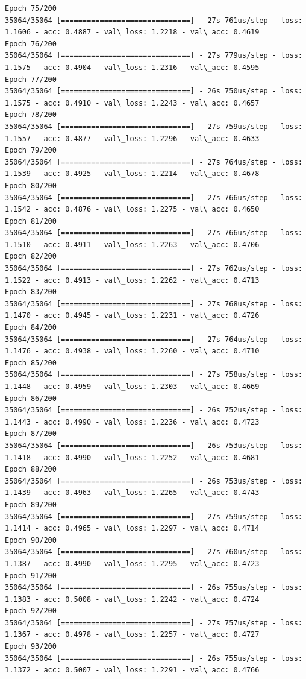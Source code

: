 \documentclass[11pt]{article}
\begin{document}
\begin{Verbatim}[commandchars=\\\{\}]
Epoch 75/200
35064/35064 [==============================] - 27s 761us/step - loss: 1.1606 - acc: 0.4887 - val\_loss: 1.2218 - val\_acc: 0.4619
Epoch 76/200
35064/35064 [==============================] - 27s 779us/step - loss: 1.1575 - acc: 0.4904 - val\_loss: 1.2316 - val\_acc: 0.4595
Epoch 77/200
35064/35064 [==============================] - 26s 750us/step - loss: 1.1575 - acc: 0.4910 - val\_loss: 1.2243 - val\_acc: 0.4657
Epoch 78/200
35064/35064 [==============================] - 27s 759us/step - loss: 1.1557 - acc: 0.4877 - val\_loss: 1.2296 - val\_acc: 0.4633
Epoch 79/200
35064/35064 [==============================] - 27s 764us/step - loss: 1.1539 - acc: 0.4925 - val\_loss: 1.2214 - val\_acc: 0.4678
Epoch 80/200
35064/35064 [==============================] - 27s 766us/step - loss: 1.1542 - acc: 0.4876 - val\_loss: 1.2275 - val\_acc: 0.4650
Epoch 81/200
35064/35064 [==============================] - 27s 766us/step - loss: 1.1510 - acc: 0.4911 - val\_loss: 1.2263 - val\_acc: 0.4706
Epoch 82/200
35064/35064 [==============================] - 27s 762us/step - loss: 1.1522 - acc: 0.4913 - val\_loss: 1.2262 - val\_acc: 0.4713
Epoch 83/200
35064/35064 [==============================] - 27s 768us/step - loss: 1.1470 - acc: 0.4945 - val\_loss: 1.2231 - val\_acc: 0.4726
Epoch 84/200
35064/35064 [==============================] - 27s 764us/step - loss: 1.1476 - acc: 0.4938 - val\_loss: 1.2260 - val\_acc: 0.4710
Epoch 85/200
35064/35064 [==============================] - 27s 758us/step - loss: 1.1448 - acc: 0.4959 - val\_loss: 1.2303 - val\_acc: 0.4669
Epoch 86/200
35064/35064 [==============================] - 26s 752us/step - loss: 1.1443 - acc: 0.4990 - val\_loss: 1.2236 - val\_acc: 0.4723
Epoch 87/200
35064/35064 [==============================] - 26s 753us/step - loss: 1.1418 - acc: 0.4990 - val\_loss: 1.2252 - val\_acc: 0.4681
Epoch 88/200
35064/35064 [==============================] - 26s 753us/step - loss: 1.1439 - acc: 0.4963 - val\_loss: 1.2265 - val\_acc: 0.4743
Epoch 89/200
35064/35064 [==============================] - 27s 759us/step - loss: 1.1414 - acc: 0.4965 - val\_loss: 1.2297 - val\_acc: 0.4714
Epoch 90/200
35064/35064 [==============================] - 27s 760us/step - loss: 1.1387 - acc: 0.4990 - val\_loss: 1.2295 - val\_acc: 0.4723
Epoch 91/200
35064/35064 [==============================] - 26s 755us/step - loss: 1.1383 - acc: 0.5008 - val\_loss: 1.2242 - val\_acc: 0.4724
Epoch 92/200
35064/35064 [==============================] - 27s 757us/step - loss: 1.1367 - acc: 0.4978 - val\_loss: 1.2257 - val\_acc: 0.4727
Epoch 93/200
35064/35064 [==============================] - 26s 755us/step - loss: 1.1372 - acc: 0.5007 - val\_loss: 1.2291 - val\_acc: 0.4766

\end{Verbatim}
\end{document}
